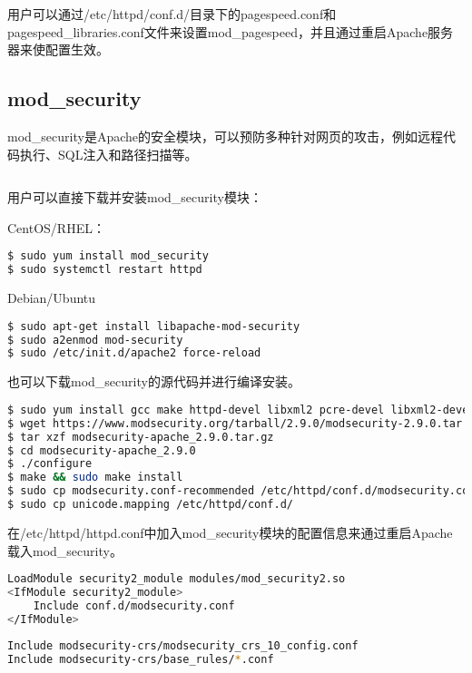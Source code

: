 用户可以通过/etc/httpd/conf.d/目录下的pagespeed.conf和pagespeed\_libraries.conf文件来设置mod\_pagespeed，并且通过重启Apache服务器来使配置生效。


\subsection{mod\_security}

mod\_security是Apache的安全模块，可以预防多种针对网页的攻击，例如远程代码执行、SQL注入和路径扫描等。




\begin{lstlisting}[language=bash]

\end{lstlisting}

用户可以直接下载并安装mod\_security模块：

CentOS/RHEL：


\begin{lstlisting}[language=bash]
$ sudo yum install mod_security
$ sudo systemctl restart httpd
\end{lstlisting}



Debian/Ubuntu

\begin{lstlisting}[language=bash]
$ sudo apt-get install libapache-mod-security
$ sudo a2enmod mod-security
$ sudo /etc/init.d/apache2 force-reload
\end{lstlisting}


也可以下载mod\_security的源代码并进行编译安装。


\begin{lstlisting}[language=bash]
$ sudo yum install gcc make httpd-devel libxml2 pcre-devel libxml2-devel curl-devel git
$ wget https://www.modsecurity.org/tarball/2.9.0/modsecurity-2.9.0.tar.gz
$ tar xzf modsecurity-apache_2.9.0.tar.gz
$ cd modsecurity-apache_2.9.0
$ ./configure
$ make && sudo make install
$ sudo cp modsecurity.conf-recommended /etc/httpd/conf.d/modsecurity.conf
$ sudo cp unicode.mapping /etc/httpd/conf.d/
\end{lstlisting}


在/etc/httpd/httpd.conf中加入mod\_security模块的配置信息来通过重启Apache载入mod\_security。


\begin{lstlisting}[language=bash]
LoadModule security2_module modules/mod_security2.so
<IfModule security2_module>
    Include conf.d/modsecurity.conf
</IfModule>
 
Include modsecurity-crs/modsecurity_crs_10_config.conf
Include modsecurity-crs/base_rules/*.conf
\end{lstlisting}






